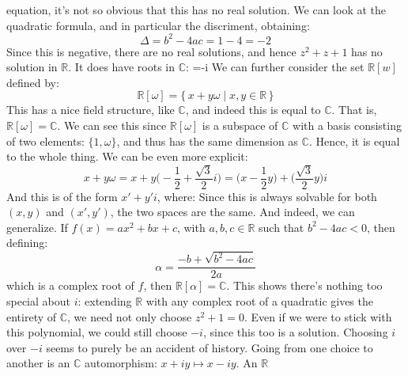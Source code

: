     equation, it's not so obvious that this has no real solution. We
    can look at the quadratic formula, and in particular the discriment,
    obtaining:
    \begin{equation}
        \Delta=b^{2}-4ac=1-4=\minus{2}
    \end{equation}
    Since this is negative, there are no real solutions, and hence
    $z^{2}+z+1$ has no solution in $\mathbb{R}$. It does have roots in
    $\mathbb{C}$:
                {\overline{\omega}=\minus{}-i}
    We can further consider the set $\mathbb{R}[w]$ defined by:
    \begin{equation}
        \mathbb{R}[\omega]=\{\,x+y\omega\;|\;x,y\in\mathbb{R}\,\}
    \end{equation}
    This has a nice field structure, like $\mathbb{C}$, and indeed this
    is equal to $\mathbb{C}$. That is, $\mathbb{R}[\omega]=\mathbb{C}$.
    We can see this since $\mathbb{R}[\omega]$ is a subspace of
    $\mathbb{C}$ with a basis consisting of two elements:
    $\{1,\omega\}$, and thus has the same dimension as $\mathbb{C}$.
    Hence, it is equal to the whole thing. We can be even more explicit:
    \begin{equation}
        x+y\omega
            =x+y\big(\minus\frac{1}{2}+\frac{\sqrt{3}}{2}i\big)
            =\big(x-\frac{1}{2}y\big)+\big(\frac{\sqrt{3}}{2}y\big)i
    \end{equation}
    And this is of the form $x'+y'i$, where:
    Since this is always solvable for both $(x,y)$ and $(x',y')$, the
    two spaces are the same. And indeed, we can generalize. If
    $f(x)=ax^{2}+bx+c$, with $a,b,c\in\mathbb{R}$ such that
    $b^{2}-4ac<0$, then defining:
    \begin{equation}
        \alpha=\frac{\minus{b}+\sqrt{b^{2}-4ac}}{2a}
    \end{equation}
    which is a complex root of $f$, then
    $\mathbb{R}[\alpha]=\mathbb{C}$. This shows there's nothing too
    special about $i$: extending $\mathbb{R}$ with any complex root of
    a quadratic gives the entirety of $\mathbb{C}$, we need not only
    choose $z^{2}+1=0$. Even if we were to stick with this polynomial,
    we could still choose $\minus{i}$, since this too is a solution.
    Choosing $i$ over $\minus{i}$ seems to purely be an accident of
    history. Going from one choice to another is an
    $\mathbb{C}$ automorphism: $x+iy\mapsto{x}-iy$. An $\mathbb{R}$
